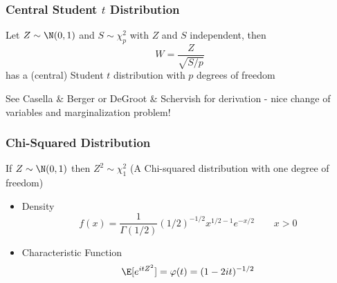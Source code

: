 \documentclass{beamer}
\begin{document}
\begin{frame}
  \frametitle{Central Student $t$ Distribution}
  \begin{definition}
    Let $Z \sim \N(0, 1)$ and $S \sim \chi^2_p$ with $Z$ and $S$
    independent, \pause then
 $$ W = \frac{Z} {\sqrt{S/p}}$$
has a (central) Student $t$ distribution with $p$ degrees of freedom
  \end{definition}
\pause
 
See Casella \& Berger or DeGroot \& Schervish for derivation - nice change of variables and marginalization problem!
\end{frame}






\begin{frame}
  \frametitle{Chi-Squared Distribution}
  \begin{Definition}
    If $Z \sim \N(0,1)$ then $Z^2 \sim \chi^2_1$ (A Chi-squared
    distribution with one degree of freedom) \pause
    \begin{itemize}
    \item Density
$$
f(x) = \frac{1}{\Gamma(1/2)} (1/2)^{-1/2} x^{1/2 - 1} e^{-x/2} \qquad x
> 0
$$ \pause
  \item  Characteristic Function
$$
\E[e^{itZ^2}] = \varphi(t) = (1 - 2 i t)^{-1/2}
$$
  \end{itemize}

\end{Definition}
\end{frame}
\end{document}
